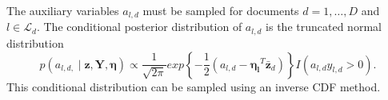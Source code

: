 \documentclass{article}
\begin{document}
The auxiliary variables $a_{l,d}$ must be sampled for documents $d=1,\ldots,D$
and $l\in\mathcal{L}_{d}$. The conditional posterior distribution
of $a_{l,d}$ is the truncated normal distribution \begin{equation}
p\left(a_{l,d,}\mid\mathbf{z},\mathbf{Y},\mathbf{\eta}\right)\propto\frac{1}{\sqrt{2\pi}}exp\left\{ -\frac{1}{2}\left(a_{l,d}-\mathbf{\eta_{l}}^{T}\mathbf{\bar{z}}_{d}\right)\right\} I\left(a_{l,d}y_{l,d}>0\right).\end{equation}
 This conditional distribution can be sampled using an inverse CDF
method. %
\end{document}
